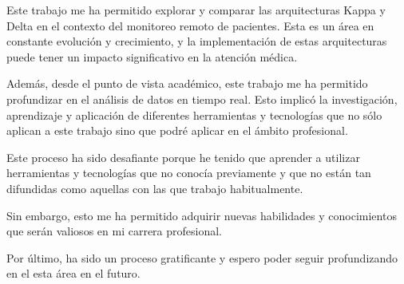 Este trabajo me ha permitido explorar y comparar las arquitecturas Kappa y Delta en el contexto del monitoreo remoto de pacientes.
Esta es un área en constante evolución y crecimiento, y la implementación de estas arquitecturas puede tener un impacto significativo en la atención médica.

Además, desde el punto de vista académico, este trabajo me ha permitido profundizar en el análisis de datos en tiempo real.
Esto implicó la investigación, aprendizaje y aplicación de diferentes herramientas y tecnologías que no sólo aplican 
a este trabajo sino que podré aplicar en el ámbito profesional.

Este proceso ha sido desafiante porque he tenido que aprender a utilizar herramientas y tecnologías que no conocía previamente 
y que no están tan difundidas como aquellas con las que trabajo habitualmente.

Sin embargo, esto me ha permitido adquirir nuevas habilidades y conocimientos que serán valiosos en mi carrera profesional.

Por último, ha sido un proceso gratificante y espero poder seguir profundizando en el esta área en el futuro.